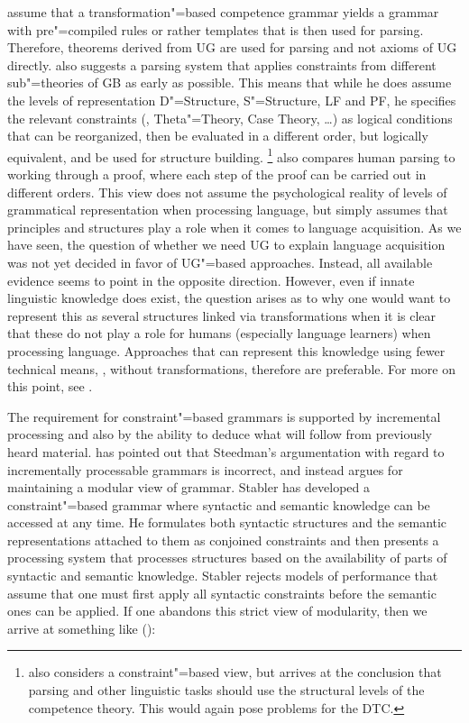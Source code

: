 \citet[]{FC96a-u} assume that a transformation"=based competence grammar yields a grammar with pre"=compiled
rules or rather templates that is then used for parsing.
Therefore, theorems derived from UG are used for parsing and not axioms of UG directly.
\citet{Johnson89a} also suggests a parsing system that applies constraints from different sub"=theories of GB as early as possible.
This means that while he does assume the levels of representation D"=Structure, S"=Structure, LF and PF, he specifies the relevant
constraints (\xbart, Theta"=Theory, Case Theory, \ldots) as logical
conditions that can be reorganized, then be evaluated in a different order, but logically
equivalent, and be used for structure building.%
\footnote{%
\citet[Section~15.7]{Stabler92a-u} also considers a constraint"=based view, but arrives at the conclusion that parsing and other linguistic
tasks should use the structural levels of the competence theory. This would again pose problems for the DTC.%
}
\citet[]{Chomsky2007a} also compares human parsing to working through a proof, where each step of the proof can be carried out in different
orders. This view does not assume the psychological reality of levels of grammatical representation when processing language, but simply assumes
that principles and structures play a role when it comes to language acquisition. 
As we have seen, the question of whether we need UG to explain language acquisition was not yet decided in favor of UG"=based approaches.
Instead, all available evidence seems to point in the opposite direction. However, even if innate linguistic knowledge does exist, the
question arises as to why one would want to represent this as several structures linked via transformations when it is clear that these do not play
a role for humans (especially language learners) when processing language.
Approaches that can represent this knowledge using fewer technical means, \eg, without transformations, therefore are preferable.
For more on this point, see .

The requirement for constraint"=based grammars is supported by incremental processing and also by
the ability to deduce what will follow from previously heard material. \cite{Stabler91a} has pointed
out that Steedman's argumentation with regard to incrementally
processable grammars is incorrect, and instead argues for maintaining a modular view of
grammar. Stabler has developed a constraint"=based grammar where syntactic and semantic
knowledge can be accessed at any time. He formulates both syntactic structures and the semantic
representations attached to them as conjoined constraints and then presents a processing system
that processes structures based on the availability of parts of syntactic and semantic
knowledge. Stabler rejects models of performance that assume that one must first apply all syntactic
constraints before the semantic ones can be applied. If one abandons this strict view of modularity,
then we arrive at something like ():

